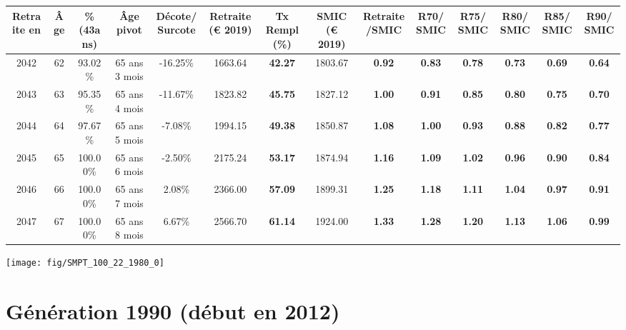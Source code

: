 \begin{adjustbox}{max width=\textwidth} 
\begin{tabular}[htb]{|c|c||c|c|c||c|c||c|c||c|c|c|c|c|} 
\hline 
 Retraite en &  Âge &  \%(43ans) &  Âge pivot &  Décote/Surcote &  Retraite (\euro{} 2019) &  Tx Rempl(\%) &  SMIC (\euro{} 2019) &  Retraite/SMIC &  R70/SMIC &  R75/SMIC &  R80/SMIC &  R85/SMIC &  R90/SMIC \\ 
\hline \hline 
 2042 &  62 &  93.02\% &  65 ans 3 mois &  -16.25\% &  1663.64 &  {\bf 42.27} &  1803.67 &  {\bf {\color{red} 0.92}} &  {\bf {\color{red} 0.83}} &  {\bf {\color{red} 0.78}} &  {\bf {\color{red} 0.73}} &  {\bf {\color{red} 0.69}} &  {\bf {\color{red} 0.64}} \\ 
\hline 
 2043 &  63 &  95.35\% &  65 ans 4 mois &  -11.67\% &  1823.82 &  {\bf 45.75} &  1827.12 &  {\bf {\color{red} 1.00}} &  {\bf {\color{red} 0.91}} &  {\bf {\color{red} 0.85}} &  {\bf {\color{red} 0.80}} &  {\bf {\color{red} 0.75}} &  {\bf {\color{red} 0.70}} \\ 
\hline 
 2044 &  64 &  97.67\% &  65 ans 5 mois &  -7.08\% &  1994.15 &  {\bf 49.38} &  1850.87 &  {\bf 1.08} &  {\bf {\color{red} 1.00}} &  {\bf {\color{red} 0.93}} &  {\bf {\color{red} 0.88}} &  {\bf {\color{red} 0.82}} &  {\bf {\color{red} 0.77}} \\ 
\hline 
 2045 &  65 &  100.00\% &  65 ans 6 mois &  -2.50\% &  2175.24 &  {\bf 53.17} &  1874.94 &  {\bf 1.16} &  {\bf 1.09} &  {\bf 1.02} &  {\bf {\color{red} 0.96}} &  {\bf {\color{red} 0.90}} &  {\bf {\color{red} 0.84}} \\ 
\hline 
 2046 &  66 &  100.00\% &  65 ans 7 mois &  2.08\% &  2366.00 &  {\bf 57.09} &  1899.31 &  {\bf 1.25} &  {\bf 1.18} &  {\bf 1.11} &  {\bf 1.04} &  {\bf {\color{red} 0.97}} &  {\bf {\color{red} 0.91}} \\ 
\hline 
 2047 &  67 &  100.00\% &  65 ans 8 mois &  6.67\% &  2566.70 &  {\bf 61.14} &  1924.00 &  {\bf 1.33} &  {\bf 1.28} &  {\bf 1.20} &  {\bf 1.13} &  {\bf 1.06} &  {\bf {\color{red} 0.99}} \\ 
\hline 
\hline 
\end{tabular} 
\end{adjustbox} 
 
 \vspace{0.1cm} 

 {\hspace{-2.2cm}\texttt{[image: fig/SMPT\_100\_22\_1980\_0]}} 

\newpage 
 
\section{Génération 1990 (début en 2012)\label{SMPT_100_22_1990_0}} 
 
